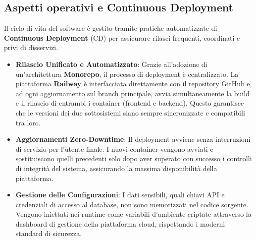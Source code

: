 \documentclass[a4paper, 11pt, oneside]{scrartcl}
\begin{document}
\subsection{Aspetti operativi e Continuous Deployment}
Il ciclo di vita del software è gestito tramite pratiche automatizzate di \textbf{Continuous Deployment} (CD) per assicurare rilasci
frequenti, coordinati e privi di disservizi.
\begin{itemize}
    \item \textbf{Rilascio Unificato e Automatizzato}: Grazie all'adozione di un'architettura \textbf{Monorepo}, il processo di deployment è
     centralizzato. La piattaforma \textbf{Railway} è interfacciata direttamente con il repository GitHub e, ad ogni aggiornamento sul branch principale,
     avvia simultaneamente la build e il rilascio di entrambi i container (frontend e backend). Questo garantisce che le versioni dei due sottosistemi
     siano sempre sincronizzate e compatibili tra loro.
    \item \textbf{Aggiornamenti Zero-Downtime}: Il deployment avviene senza interruzioni di servizio per l'utente finale. I nuovi container vengono
     avviati e sostituiscono quelli precedenti solo dopo aver superato con successo i controlli di integrità del sistema, assicurando la massima
     disponibilità della piattaforma.
    \item \textbf{Gestione delle Configurazioni}: I dati sensibili, quali chiavi API e credenziali di accesso al database, non sono memorizzati nel
     codice sorgente. Vengono iniettati nei runtime come variabili d'ambiente criptate attraverso la dashboard di gestione della piattaforma cloud,
     rispettando i moderni standard di sicurezza.
\end{itemize}
\end{document}
